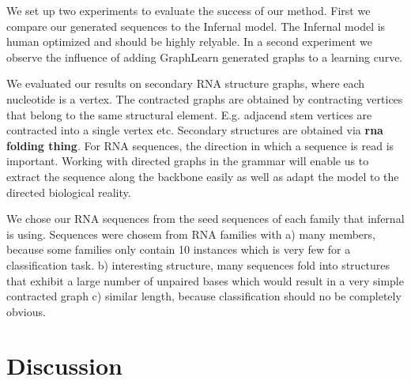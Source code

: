 \documentclass{article}
\begin{document}
We set up two experiments to evaluate the success of our method. 
First we compare our generated sequences to the Infernal model.
The Infernal model is human optimized and should be highly relyable.
In a second experiment we observe the influence of adding GraphLearn 
generated graphs to a learning curve.

We evaluated our results on secondary RNA structure graphs, where each 
nucleotide is a vertex. The contracted graphs are obtained by 
contracting vertices that belong to the same structural element.
E.g. adjacend stem vertices are contracted into a single vertex etc.
Secondary structures are obtained via \textbf{rna folding thing}.
For RNA sequences, the direction in which a sequence is read is important.
Working with directed graphs in the grammar will enable us to extract the
sequence along the backbone easily as well as adapt the model
to the directed biological reality.

We chose our RNA sequences from the seed sequences of each family
that infernal is using. Sequences were chosem from RNA families with
a) many members, because some families only contain 10
instances which is very few for a classification task. b) interesting 
structure, many sequences fold into structures that exhibit a large number of 
unpaired bases which would result in a very simple contracted graph
c) similar length, because classification should no be completely obvious.





\section{Discussion} 
\end{document}
